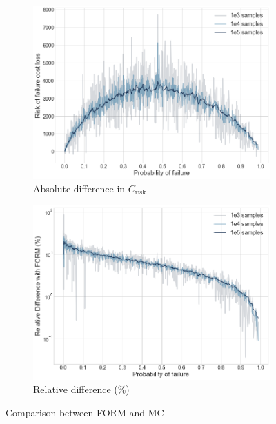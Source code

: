 \begin{figure}[H]
\begin{subfigure}[b]{0.48\textwidth}
        \centering
        \includegraphics[width=\textwidth]{Figures/FORMvsMCriskFail.png}
        \caption{Absolute difference in $C_{\text{risk}}$}
        \label{formMcAbsRisk}
    \end{subfigure}
    \begin{subfigure}[b]{0.48\textwidth}
        \centering
        \includegraphics[width=\textwidth]{Figures/FORMvsMCrel.png}
        \caption{Relative difference (\%)}
        \label{formMcRelPf}
    \end{subfigure}
    \caption{Comparison between \gls{FORM} and \gls{MC}}
    \label{formMcDiffs}
\end{figure}

